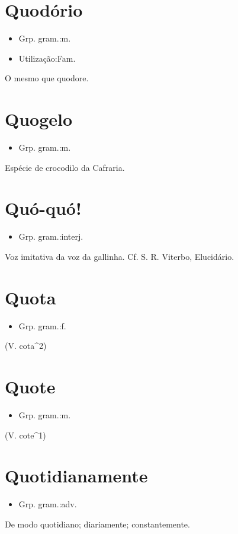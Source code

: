 \section{Quodório}
\begin{itemize}
\item {Grp. gram.:m.}
\end{itemize}
\begin{itemize}
\item {Utilização:Fam.}
\end{itemize}
O mesmo que \textunderscore quodore\textunderscore .
\section{Quogelo}
\begin{itemize}
\item {Grp. gram.:m.}
\end{itemize}
Espécie de crocodilo da Cafraria.
\section{Quó-quó!}
\begin{itemize}
\item {Grp. gram.:interj.}
\end{itemize}
Voz imitativa da voz da gallinha. Cf. S. R. Viterbo, \textunderscore Elucidário\textunderscore .
\section{Quota}
\begin{itemize}
\item {Grp. gram.:f.}
\end{itemize}
(V. \textunderscore cota\textunderscore ^2)
\section{Quote}
\begin{itemize}
\item {Grp. gram.:m.}
\end{itemize}
(V. \textunderscore cote\textunderscore ^1)
\section{Quotidianamente}
\begin{itemize}
\item {Grp. gram.:adv.}
\end{itemize}
De modo quotidiano; diariamente; constantemente.
